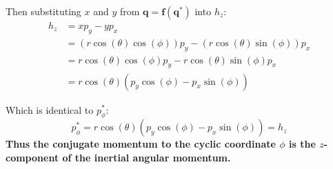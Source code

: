 \documentclass[titlepage]{article}
\begin{document}
Then substituting $x$ and $y$ from $\boldsymbol{q}=\boldsymbol{f}(\boldsymbol{q}^*)$ into $h_z$:
\begin{equation}
	\begin{split}
		h_z&=xp_y-yp_x \\
		&=\left(r\cos(\theta)\cos(\phi)\right)p_y-\left(r\cos(\theta)\sin(\phi)\right)p_x \\
		&=r\cos(\theta)\cos(\phi)p_y-r\cos(\theta)\sin(\phi)p_x \\
		&=r\cos(\theta)\left(p_y\cos(\phi)-p_x\sin(\phi)\right)
	\end{split}
\end{equation}

\begin{mdframed}[linewidth=1pt, innertopmargin=10pt, innerbottommargin=10pt]
	Which is identical to $p_\phi^*$:
	\begin{equation}
		p_\phi^*=r\cos(\theta)\left(p_y\cos(\phi)-p_x\sin(\phi)\right)=h_z
	\end{equation}
	\textbf{Thus the conjugate momentum to the cyclic coordinate $\phi$ is the $z$-component of the inertial angular momentum.}
\end{mdframed}
\end{document}
